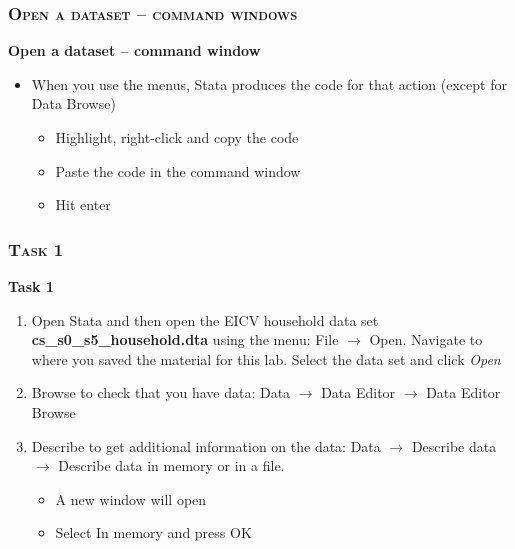 \documentclass[10pt]{beamer}
\begin{document}
	\begin{frame}
		\frametitle{\textsc{Open a dataset – command windows}}
		\begin{center}
			\Large\textbf{Open a dataset – command window}
		\end{center}
		\begin{itemize}
			\item When you use the menus, Stata produces the code for that action (except for Data Browse)
			\begin{itemize}
				\item Highlight, right-click and copy the code
				\item Paste the code in the command window
				\item Hit enter
			\end{itemize}
		\end{itemize}
	\end{frame}


	\begin{frame}
		\frametitle{\textsc{Task 1}}
		\begin{center}
			\Large\textbf{Task 1}
		\end{center}
		\begin{enumerate}
			\item Open Stata and then open the EICV household data set \textbf{cs\_s0\_s5\_household.dta} using the menu: File $\rightarrow$ Open. Navigate to where you saved the material for this lab. Select the data set and click \textit{Open}
			\item Browse to check that you have data: Data  $\rightarrow$ Data Editor  $\rightarrow$ Data Editor Browse 
			\item Describe to get additional information on the data: Data  $\rightarrow$ Describe data $\rightarrow$ Describe data in memory or in a file.
			\begin{itemize}
				\item A new window will open
				\item Select In memory and press OK
			\end{itemize}
		\end{enumerate}
	\end{frame}
\end{document}
